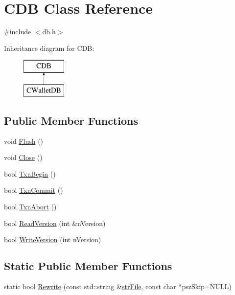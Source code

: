\hypertarget{class_c_d_b}{}\section{C\+D\+B Class Reference}
\label{class_c_d_b}


{\ttfamily \#include $<$db.\+h$>$}

Inheritance diagram for C\+D\+B\+:\begin{figure}[H]
\begin{center}
\leavevmode
\includegraphics[height=2.000000cm]{class_c_d_b}
\end{center}
\end{figure}
\subsection*{Public Member Functions}
\begin{DoxyCompactItemize}
\item 
void \hyperlink{class_c_d_b_ab4a0447a8d19b4871b9fcc40edee9480}{Flush} ()
\item 
void \hyperlink{class_c_d_b_af8bbf106662d67cdfdd6d58c429bc54b}{Close} ()
\item 
bool \hyperlink{class_c_d_b_a6f817da7947e1498e44034b7a1c8ac10}{Txn\+Begin} ()
\item 
bool \hyperlink{class_c_d_b_a45061b3e71251dc74ddd868afb760590}{Txn\+Commit} ()
\item 
bool \hyperlink{class_c_d_b_af9b0924f1ca98e0544e78e9bb58b4f03}{Txn\+Abort} ()
\item 
bool \hyperlink{class_c_d_b_a16f591e27f41397570018c1fae084025}{Read\+Version} (int \&n\+Version)
\item 
bool \hyperlink{class_c_d_b_aa3e63c0921af4c6fc92def1ba14500f1}{Write\+Version} (int n\+Version)
\end{DoxyCompactItemize}
\subsection*{Static Public Member Functions}
\begin{DoxyCompactItemize}
\item 
static bool \hyperlink{class_c_d_b_acfb8a373edb9c4cfab780fb7578b277e}{Rewrite} (const std\+::string \&\hyperlink{class_c_d_b_a15c6112d9db9dcc5f11a2c05d9aa74a5}{str\+File}, const char $\ast$psz\+Skip=N\+U\+L\+L)
\end{DoxyCompactItemize}
